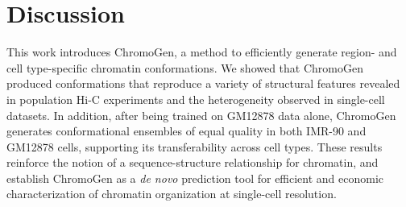 \documentclass[12pt,letterpaper]{article}
\begin{document}
\begin{comment}
\begin{figure}[H]
    \centering
    \texttt{[image: ./figures/GM\_vs\_IMR8.pdf]}
    \caption{
    \textbf{ChromoGen produces accurate, cell-type specific chromatin conformations.}
    (a)
    In each of three regions, the experimental Hi-C interaction frequencies (left) and population-median, generated distance maps (right) are shown for both GM12878 (upper triangle) and IMR-90 (lower triangle) cell types. 
    The DNase-seq accessibility data are shown for both IMR-90 (left) and GM12878 (right) cells.
    (b) Distance maps of two ChromoGen structures from GM12878 and IMR-90 cells for the region in chromosome 21 shown in part a. The bottom panel shows the corresponding  probability distribution of boundary strength (left) and  probability for each genomic location to appear as a domain boundary in individual structures (right) in the same region for the two cell types, determined using an ensemble of generated conformation. 
    (c) 
    The distribution of Pearson correlation coefficients between median distances and log Hi-C contact probabilities (left) and between experimental Hi-C contact probabilities and those inferred from distances (right). Distances were determined using ChromoGen structures for the two cell types. 
    (f) Comparison between the Pearson correlation coefficients of insulation scores computed using population Hi-C and those derived from ChromoGen distances for GM12878 and IMR-90 cells. 
    }
    \label{fig:transferability}
\end{figure}
\end{comment}






\section*{Discussion}

This work introduces ChromoGen, a method to efficiently generate region- and cell type-specific chromatin conformations. We showed that ChromoGen produced conformations that reproduce a variety of structural features revealed in population Hi-C experiments and the heterogeneity observed in single-cell datasets. In addition, after being trained on GM12878 data alone, ChromoGen generates conformational ensembles of equal quality in both IMR-90 and GM12878 cells, supporting its transferability across cell types. These results reinforce the notion of a sequence-structure relationship for chromatin, and establish ChromoGen as a \emph{de novo} prediction tool for efficient and economic characterization of chromatin organization at single-cell resolution.  
\end{document}
